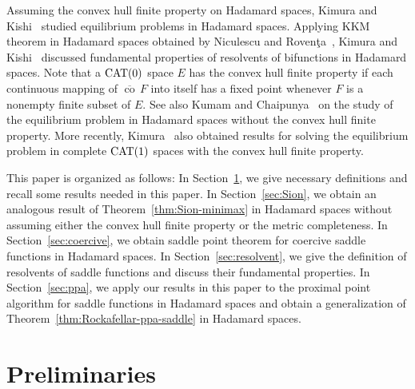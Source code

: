\documentclass[draft]{amsart}
\numberwithin{equation}{section}
\DeclareMathOperator{\Co}{\mathrm{co}}
\newcommand{\CAT}{\textup{CAT}}
\theoremstyle{plain}
\theoremstyle{definition}
\theoremstyle{remark}
\begin{document}
Assuming the convex hull finite property 
on Hadamard spaces, Kimura and Kishi~\cite{MR3897196} 
studied equilibrium problems in Hadamard spaces. 
Applying KKM theorem in Hadamard spaces obtained by 
Niculescu and Roven\c ta~\cite{MR2561730}, 
Kimura and Kishi~\cite{MR3897196} discussed fundamental properties of 
resolvents of bifunctions in Hadamard spaces. 
Note that a $\CAT(0)$ space $E$ has the convex hull finite 
property if each continuous mapping 
of $\overline{\Co}\, F$ into itself 
has a fixed point whenever $F$  
is a nonempty finite subset of $E$. 
See also Kumam and Chaipunya~\cite{MR4049738} 
on the study of the equilibrium problem in Hadamard spaces without 
the convex hull finite property. 
More recently, Kimura~\cite{MR4286979} 
also obtained results for solving the equilibrium problem 
in complete $\CAT(1)$ spaces with the convex hull finite property. 

This paper is organized as follows: 
In Section~\ref{sec:preliminaries}, we give 
necessary definitions and recall some results needed in this paper. 
In Section~\ref{sec:Sion}, we obtain an analogous result of 
Theorem~\ref{thm:Sion-minimax} in Hadamard spaces 
without assuming either the convex hull finite property or 
the metric completeness. 
In Section~\ref{sec:coercive}, we obtain saddle point theorem 
for coercive saddle functions in Hadamard spaces. 
In Section~\ref{sec:resolvent}, we give the definition of 
resolvents of saddle functions and discuss their fundamental properties. 
In Section~\ref{sec:ppa}, we apply our results in this paper 
to the proximal point algorithm for saddle functions in Hadamard spaces 
and obtain a generalization of Theorem~\ref{thm:Rockafellar-ppa-saddle} 
in Hadamard spaces. 

\section{Preliminaries}\label{sec:preliminaries}
\end{document}
